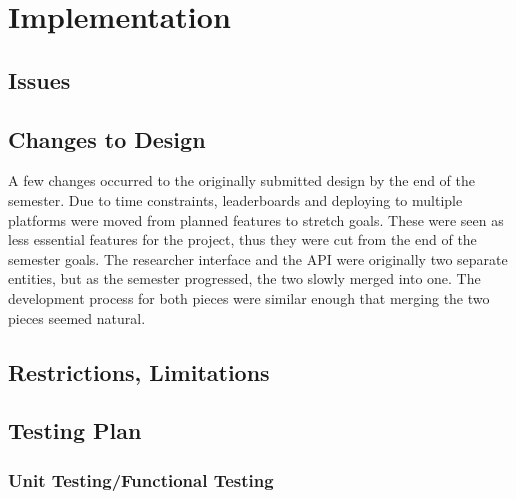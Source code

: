 \documentclass{article}
\begin{document}
\section{Implementation}
\subsection{Issues}

\subsection{Changes to Design}
A few changes occurred to the originally submitted design by the end of the
semester.  Due to time constraints, leaderboards and deploying to multiple
platforms were moved from planned features to stretch goals.  These were seen
as less essential features for the project, thus they were cut from the end of
the semester goals.  The researcher interface and the API were originally two
separate entities, but as the semester progressed, the two slowly merged into
one.  The development process for both pieces were similar enough that merging
the two pieces seemed natural.

\subsection{Restrictions, Limitations}

\subsection{Testing Plan}
\subsubsection{Unit Testing/Functional Testing}
\end{document}
